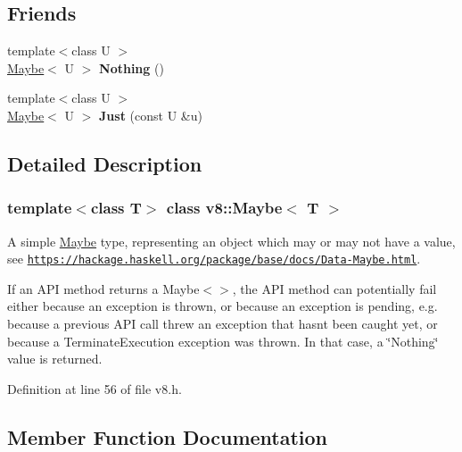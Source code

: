 \subsection*{Friends}
\begin{DoxyCompactItemize}
\item 
\mbox{\label{classv8_1_1Maybe_aeb9593e125b42d748acbd69b72c89f37}} 
{\footnotesize template$<$class U $>$ }\\\mbox{\hyperlink{classv8_1_1Maybe}{Maybe}}$<$ U $>$ {\bfseries Nothing} ()
\item 
\mbox{\label{classv8_1_1Maybe_aeff0e7fedd63cfebe9a5286e2cd8552d}} 
{\footnotesize template$<$class U $>$ }\\\mbox{\hyperlink{classv8_1_1Maybe}{Maybe}}$<$ U $>$ {\bfseries Just} (const U \&u)
\end{DoxyCompactItemize}


\subsection{Detailed Description}
\subsubsection*{template$<$class T$>$\newline
class v8\+::\+Maybe$<$ T $>$}

A simple \mbox{\hyperlink{classv8_1_1Maybe}{Maybe}} type, representing an object which may or may not have a value, see \href{https://hackage.haskell.org/package/base/docs/Data-Maybe.html}{\tt https\+://hackage.\+haskell.\+org/package/base/docs/\+Data-\/\+Maybe.\+html}.

If an A\+PI method returns a Maybe$<$$>$, the A\+PI method can potentially fail either because an exception is thrown, or because an exception is pending, e.\+g. because a previous A\+PI call threw an exception that hasn\textquotesingle{}t been caught yet, or because a Terminate\+Execution exception was thrown. In that case, a \char`\"{}\+Nothing\char`\"{} value is returned. 

Definition at line 56 of file v8.\+h.



\subsection{Member Function Documentation}
\mbox{\label{classv8_1_1Maybe_a6c35f4870a5b5049d09ba5f13c67ede9}} 

